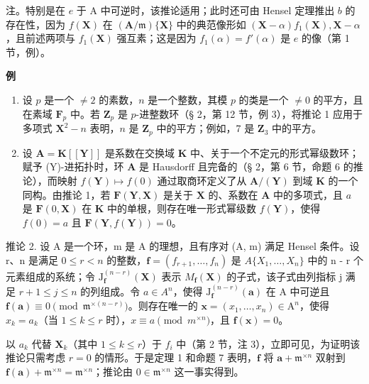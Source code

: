 注。特别是在 \(e\) 于 A 中可逆时，该推论适用；此时还可由 Hensel 定理推出 \(b\) 的存在性，因为 \(f(\mathbf{X})\) 在 \((\mathbf{A} / \mathfrak{m})\{\mathbf{X}\}\) 中的典范像形如 \((\mathbf{X} - \alpha)f_1(\mathbf{X}), \mathbf{X} - \alpha\)，且前述两项与 \(f_1(\mathbf{X})\) 强互素；这是因为 \(f_1(\alpha) = f'(\alpha)\) 是 \(e\) 的像（第 1 节，例）。

\textbf{例}\par

\begin{enumerate}
\def\labelenumi{(\arabic{enumi})}
\item
 设 \(p\) 是一个 \(\neq 2\) 的素数，\(n\) 是一个整数，其模 \(p\) 的类是一个 \(\neq 0\) 的平方，且在素域 \(\mathbf{F}_p\) 中。若 \(\mathbf{Z}_p\) 是 \(p\)-进整数环（§ 2，第 12 节，例 3），将推论 1 应用于多项式 \(\mathbf{X}^2 - n\) 表明，\(n\) 是 \(\mathbf{Z}_p\) 中的平方；例如，7 是 \(\mathbf{Z}_3\) 中的平方。
\item
  设 \(\mathbf{A} = \mathbf{K}[[\mathbf{Y}]]\) 是系数在交换域 \(\mathbf{K}\) 中、关于一个不定元的形式幂级数环；赋予 (Y)-进拓扑时，环 \(\mathbf{A}\) 是 Hausdorff 且完备的（§ 2，第 6 节，命题 6 的推论），而映射 \(f(\mathbf{Y}) \mapsto f(0)\) 通过取商环定义了从 \(\mathbf{A}/(\mathbf{Y})\) 到域 \(\mathbf{K}\) 的一个同构。由推论 1，若 \(\mathbf{F}(\mathbf{Y}, \mathbf{X})\) 是关于 \(\mathbf{X}\) 的、系数在 \(\mathbf{A}\) 中的多项式，且 \(a\) 是 \(\mathbf{F}(0, \mathbf{X})\) 在 \(\mathbf{K}\) 中的单根，则存在唯一形式幂级数 \(f(\mathbf{Y})\)，使得 \(f(0) = a\) 且 \(\mathbf{F}(\mathbf{Y}, f(\mathbf{Y})) = 0\)。
\end{enumerate}

推论 2. 设 A 是一个环，m 是 A 的理想，且有序对 (A, m) 满足 Hensel 条件。设 r、n 是满足 \(0 \leqslant r < n\) 的整数，\(\mathbf{f} = (f_{r+1}, \ldots, f_n)\) 是 \(A\{X_1, \ldots, X_n\}\) 中的 n - r 个元素组成的系统；令 \(\mathrm{J}_{\mathbf{f}}^{(n-r)}(\mathbf{X})\) 表示 \(M_{\mathbf{f}}(\mathbf{X})\) 的子式，该子式由列指标 j 满足 \(r + 1 \leqslant j \leqslant n\) 的列组成。令 \(a \in A^n\)，使得 \(\mathrm{J}_{\mathbf{f}}^{(n-r)}(\mathbf{a})\) 在 A 中可逆且 \(\mathbf{f}(\mathbf{a}) \equiv 0 \pmod{\mathfrak{m}^{\times(n-r)}}\)。则存在唯一的 \(\mathbf{x} = (x_1, \ldots, x_n) \in \mathrm{A}^n\)，使得 \(x_k = a_k\)（当 \(1 \leqslant k \leqslant r\) 时），\(x \equiv a \pmod{m^{\times n}}\)，且 \(\mathbf{f}(\mathbf{x}) = 0\)。

以 \(a_k\) 代替 \(\mathbf{X}_k\)（其中 \(1 \leqslant k \leqslant r\)）于 \(f_i\) 中（第 2 节，注 3），立即可见，为证明该推论只需考虑 \(r = 0\) 的情形。于是定理 1 和命题 7 表明，\(\mathbf{f}\) 将 \(\mathbf{a} + \mathfrak{m}^{\times n}\) 双射到 \(\mathbf{f}(\mathbf{a}) + \mathfrak{m}^{\times n} = \mathfrak{m}^{\times n}\)；推论由 \(0 \in \mathfrak{m}^{\times n}\) 这一事实得到。

